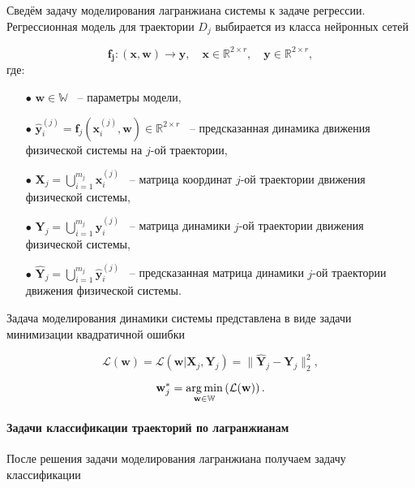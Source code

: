 \documentclass[12pt, twoside]{article}
\begin{document}
        Сведём задачу моделирования лагранжиана системы к задаче регрессии. Регрессионная модель для траектории $D_j$ выбирается из класса нейронных сетей

        $$\mathbf{f_j} \colon (\mathbf{x}, \mathbf{w}) \to \mathbf{y}, \quad \mathbf{x} \in \mathbb{R}^{2 \times r}, \quad \mathbf{y} \in \mathbb{R}^{2 \times r},$$ 
        где: 
    
        \begin{itemize}
    
            \item[$\bullet$] $\mathbf{w} \in \mathbb{W}$ ~-- параметры модели, 

            \item[$\bullet$] $\hat{\mathbf{y}}_i^{(j)} = \mathbf{f}_j (\mathbf{x}_i^{(j)}, \mathbf{w}) \in \mathbb{R}^{2 \times r}$ ~-- предсказанная динамика движения физической системы на $j$-ой траектории,
        
            \item[$\bullet$] $\mathbf{X}_j = \bigcup_{i=1}^{m_j} \mathbf{x}_i^{(j)}$ ~-- матрица координат $j$-ой траектории движения физической системы,
            
            \item[$\bullet$] $\mathbf{Y}_j = \bigcup_{i=1}^{m_j} \mathbf{y}_i^{(j)}$ ~-- матрица динамики $j$-ой траектории движения физической системы,
            
            \item[$\bullet$] $\hat{\mathbf{Y}}_j = \bigcup_{i=1}^{m_j} \hat{\mathbf{y}}_i^{(j)}$ ~-- предсказанная матрица динамики $j$-ой траектории движения физической системы.
        
        \end{itemize}

        Задача моделирования динамики системы представлена в виде задачи минимизации квадратичной ошибки

        $$\mathcal{L}(\textbf{w}) = \mathcal{L}(\mathbf{w} | \mathbf{X}_j, \mathbf{Y}_j) = \| \hat{\mathbf{Y}}_j - \mathbf{Y}_j \|_2^2,$$
    
        $$\textbf{w}_j^* = \argmin_{\mathbf{w} \in \mathbb{W}} \left( \mathcal{L}(\textbf{w}) \right).$$

    \paragraph{Задачи классификации траекторий по лагранжианам}

        После решения задачи моделирования лагранжиана получаем задачу классификации
\end{document}
